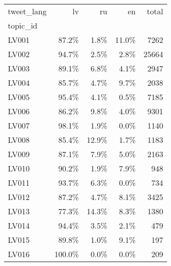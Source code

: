 \begin{tabular}{lrrrr}
\toprule
tweet\_lang &     lv &    ru &    en &  total \\
topic\_id &        &       &       &        \\
\midrule
LV001    &  87.2\% &  1.8\% & 11.0\% &   7262 \\
LV002    &  94.7\% &  2.5\% &  2.8\% &  25664 \\
LV003    &  89.1\% &  6.8\% &  4.1\% &   2947 \\
LV004    &  85.7\% &  4.7\% &  9.7\% &   2038 \\
LV005    &  95.4\% &  4.1\% &  0.5\% &   7185 \\
LV006    &  86.2\% &  9.8\% &  4.0\% &   9301 \\
LV007    &  98.1\% &  1.9\% &  0.0\% &   1140 \\
LV008    &  85.4\% & 12.9\% &  1.7\% &   1183 \\
LV009    &  87.1\% &  7.9\% &  5.0\% &   2163 \\
LV010    &  90.2\% &  1.9\% &  7.9\% &    948 \\
LV011    &  93.7\% &  6.3\% &  0.0\% &    734 \\
LV012    &  87.2\% &  4.7\% &  8.1\% &   3425 \\
LV013    &  77.3\% & 14.3\% &  8.3\% &   1380 \\
LV014    &  94.4\% &  3.5\% &  2.1\% &    479 \\
LV015    &  89.8\% &  1.0\% &  9.1\% &    197 \\
LV016    & 100.0\% &  0.0\% &  0.0\% &    209 \\
\bottomrule
\end{tabular}
